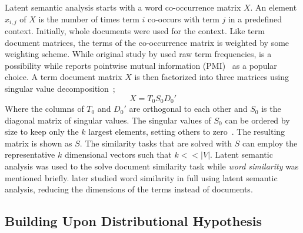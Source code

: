 Latent semantic analysis starts with a word co-occurrence matrix $X$.
An element $x_{i,j}$ of $X$ is the number of times term $i$ co-occurs with term $j$ in a predefined context.
Initially, whole documents were used for the context.
Like term document matrices, the terms of the co-occurrence matrix is weighted by some weighting scheme.
While original study by \citeauthor{deerwester_indexing_1990} used raw term frequencies, \tfidf{} is a possibility while \textcite{levy_improving_2015} reports pointwise mutual information (PMI)~\cite{church_word_1990} as a popular choice.
A term document matrix $X$ is then factorized into three matrices using singular value decomposition~\cite{forsythe_computer_1977};
\begin{displaymath}
    X = T_{0}S_{0}D_{0}'
\end{displaymath}
Where the columns of $T_{0}$ and $D_{0}'$ are orthogonal to each other and $S_{0}$ is the diagonal matrix of singular values.
The singular values of $S_{0}$ can be ordered by size to keep only the $k$ largest elements, setting others to zero~\cite{deerwester_indexing_1990}.
The resulting matrix is shown as $S$.
The similarity tasks that are solved with $S$ can employ the representative $k$ dimensional vectors such that $k << |V|$.
Latent semantic analysis was used to the solve document similarity task while \emph{word similarity} was mentioned briefly.
\textcite{landauer_solution_1997} later studied word similarity in full using latent semantic analysis, reducing the dimensions of the terms instead of documents.

\subsection{Building Upon Distributional Hypothesis}%
\label{sub:building_upon_distributional_hypothesis}

